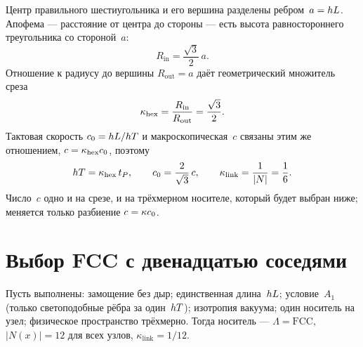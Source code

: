 Центр правильного шестиугольника и его вершина разделены ребром~$a=hL$.
Апофема --- расстояние от центра до стороны --- есть высота равностороннего треугольника со стороной~$a$:
\[
  R_{\mathrm{in}}=\frac{\sqrt{3}}{2}\,a.
\]
Отношение к радиусу до вершины $R_{\mathrm{out}}=a$ даёт геометрический множитель среза
\[
  \kappa_{\mathrm{hex}}=\frac{R_{\mathrm{in}}}{R_{\mathrm{out}}}=\frac{\sqrt{3}}{2}.
\]
Тактовая скорость $c_0=hL/hT$ и макроскопическая~$c$ связаны этим же отношением, $c=\kappa_{\mathrm{hex}} c_0$,
поэтому
\[
  hT=\kappa_{\mathrm{hex}}\,t_P,\qquad
  c_0=\frac{2}{\sqrt{3}}\,c,\qquad
  \kappa_{\mathrm{link}}=\frac{1}{|N|}=\frac{1}{6}.
\]
Число~$c$ одно и на срезе, и на трёхмерном носителе, который будет выбран ниже;
меняется только разбиение $c=\kappa c_0$.

\section{Выбор FCC с двенадцатью соседями}
\label{sec:fcc-choice}

\begin{theorem}[Носитель в $(3{+}1)$]
\label{thm:fcc-choice}
Пусть выполнены: замощение без дыр; единственная длина~$hL$;
условие~$A_1$ (только светоподобные рёбра за один~$hT$);
изотропия вакуума; один носитель на узел; физическое пространство трёхмерно.
Тогда носитель --- $\Lambda=\mathrm{FCC}$, $|N(x)|=12$ для всех узлов,
$\kappa_{\mathrm{link}}=1/12$.
\end{theorem}

